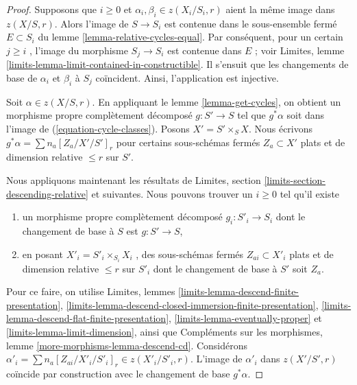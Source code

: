 \begin{proof} 
Supposons que  $i \geq 0$  et  $\alpha_i, \beta_i \in z(X_i/S_i, r)$
  aient la même image dans $z(X/S, r)$. Alors l'image de  $S \to S_i$
  est contenue dans le sous-ensemble fermé $E \subset S_i$  du
 lemme \ref{lemma-relative-cycles-equal}. Par conséquent,
 pour un certain  $j \geq i$ , l'image du morphisme  $S_j \to S_i$
  est contenue dans  $E$ ; voir Limites, lemme 
\ref{limits-lemma-limit-contained-in-constructible}. Il 
s'ensuit que les changements de base de  
$\alpha_i$  et $\beta_i$  à  $S_j$  coïncident. Ainsi, l'application est injective. 

\medskip\noindent
 Soit  $\alpha \in z(X/S, r)$. En appliquant le lemme \ref{lemma-get-cycles}, on 
obtient un morphisme propre complètement décomposé  $g : S' \to S$  tel que  $g^*\alpha$
  soit dans l'image de (\ref{equation-cycle-classes}). 
Posons  $X' = S' \times_S X$. Nous écrivons  $g^*\alpha = \sum n_a [Z_a/X'/S']_r$
  pour certains sous-schémas fermés  $Z_a \subset X'$  plats et 
de dimension relative  $\leq r$  sur $S'$. 

\medskip\noindent
 Nous appliquons maintenant les résultats
 de Limites, section \ref{limits-section-descending-relative} et suivantes. Nous 
pouvons trouver un  $i \geq 0$  tel qu'il existe 
\begin{enumerate} 
\item un morphisme propre complètement décomposé  $g_i : S'_i \to S_i$
  dont le changement de base à  $S$  est  $g : S' \to S$, 
\item en posant  $X'_i = S'_i \times_{S_i} X_i$
 , des sous-schémas fermés  $Z_{ai} \subset X'_i$  plats et de
 dimension relative  $\leq r$  sur  $S'_i$  dont le changement de base à $S'$
  soit  $Z_a$. 
\end{enumerate} 
Pour ce faire, on utilise Limites, lemmes 
\ref{limits-lemma-descend-finite-presentation}, 
\ref{limits-lemma-descend-closed-immersion-finite-presentation}, 
\ref{limits-lemma-descend-flat-finite-presentation}, 
\ref{limits-lemma-eventually-proper} et 
\ref{limits-lemma-limit-dimension}, ainsi que
 Compléments sur les morphismes, lemme 
\ref{more-morphisms-lemma-descend-cd}. 
Considérons  
$\alpha'_i = \sum n_a [Z_{ai}/X'_i/S'_i]_r \in z(X'_i/S'_i, r)$.
 L'image de  $\alpha'_i$  dans  $z(X'/S', r)$ coïncide par construction avec le changement de base  
$g^*\alpha$. 


\end{proof}
